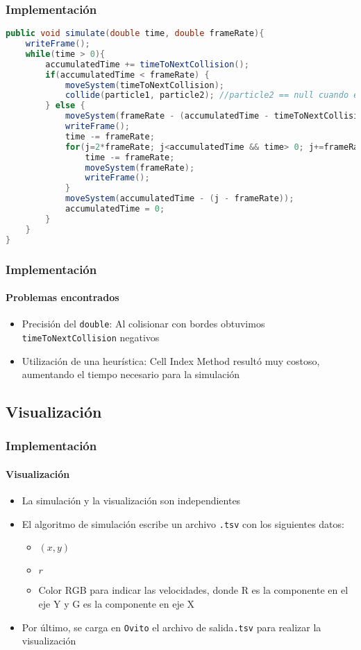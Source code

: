 \documentclass[hyperref={pdfpagelayout=SinglePage}]{beamer}
\begin{document}
\begin{frame}[fragile]
\frametitle{Implementación}
\begin{lstlisting}[language=Java, caption = Algoritmo de simulación del sistema.]
public void simulate(double time, double frameRate){
	writeFrame();
	while(time > 0){
		accumulatedTime += timeToNextCollision();
		if(accumulatedTime < frameRate) {
			moveSystem(timeToNextCollision);
			collide(particle1, particle2); //particle2 == null cuando es borde
		} else {
			moveSystem(frameRate - (accumulatedTime - timeToNextCollision));
			writeFrame();
			time -= frameRate;
			for(j=2*frameRate; j<accumulatedTime && time> 0; j+=frameRate) {
				time -= frameRate;
				moveSystem(frameRate);
				writeFrame();
			}
			moveSystem(accumulatedTime - (j - frameRate));
			accumulatedTime = 0;
		}
	}
}
\end{lstlisting}
\end{frame}

\begin{frame}
\frametitle{Implementación}
\framesubtitle{Problemas encontrados}
\begin{itemize}
\item Precisión del \texttt{double}: Al colisionar con bordes obtuvimos \texttt{timeToNextCollision} negativos
\item Utilización de una heurística: Cell Index Method resultó muy costoso, aumentando el tiempo necesario para la simulación
\end{itemize}
\end{frame}

\subsection{Visualización}

\begin{frame}
\frametitle{Implementación}
\framesubtitle{Visualización}
\begin{itemize}
	\item La simulación y la visualización son independientes
	\item El algoritmo de simulación escribe un archivo \texttt{.tsv} con los siguientes datos:
\begin{itemize}
\item $(x,y)$
\item $r$
\item Color RGB para indicar las velocidades, donde R es la componente en el eje Y y G es la componente en eje X
\end{itemize}
\item Por último, se carga en \texttt{Ovito} el archivo de salida\texttt{.tsv} para realizar la visualización
\end{itemize}
\end{frame}
\end{document}
